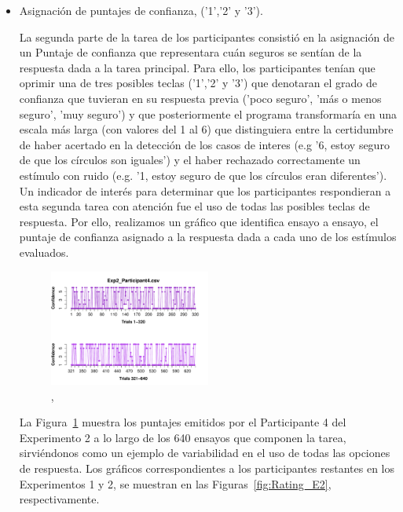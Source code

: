 \begin{itemize}
Las Figuras~\ref{fig:BiasResp_E1} y () muestran las gráficas correspondientes al resto de los participantes en el Experimento 1 y 2, respectivamente.\\

\item Asignación de puntajes de confianza, ('1','2' y '3').

La segunda parte de la tarea de los participantes consistió en la asignación de un Puntaje de confianza que representara cuán seguros se sentían de la respuesta dada a la tarea principal. Para ello, los participantes tenían que oprimir una de tres posibles teclas ('1','2' y '3') que denotaran el grado de confianza que tuvieran en su respuesta previa ('poco seguro', 'más o menos seguro', 'muy seguro') y que posteriormente el programa transformaría en una escala más larga (con valores del 1 al 6) que distinguiera entre la certidumbre de haber acertado en la detección de los casos de interes (e.g '6, estoy seguro de que los círculos son iguales') y el haber rechazado correctamente un estímulo con ruido (e.g. '1, estoy seguro de que los círculos eran diferentes'). Un indicador de interés para determinar que los participantes respondieran a esta segunda tarea con atención fue el uso de todas las posibles teclas de respuesta. Por ello, realizamos un gráfico que identifica ensayo a ensayo, el puntaje de confianza asignado a la respuesta dada a cada uno de los estímulos evaluados.


\begin{figure}[th]
\centering
\includegraphics[width=0.50\textwidth]{Figures/Rating_Exp2_P4} 
\caption[Asignacion Puntaje de confianza: Participante con multiples elecciones]{,}
\label{fig:Rating_E2_P4}
\end{figure}

La Figura~\ref{fig:Rating_E2_P4} muestra los puntajes emitidos por el Participante 4 del Experimento 2 a lo largo de los 640 ensayos que componen la tarea, sirviéndonos como un ejemplo de variabilidad en el uso de todas las opciones de respuesta. Los gráficos correspondientes a los participantes restantes en los Experimentos 1 y 2, se muestran en las Figuras~\ref{fig:Rating_E2}, respectivamente.


\end{itemize}



